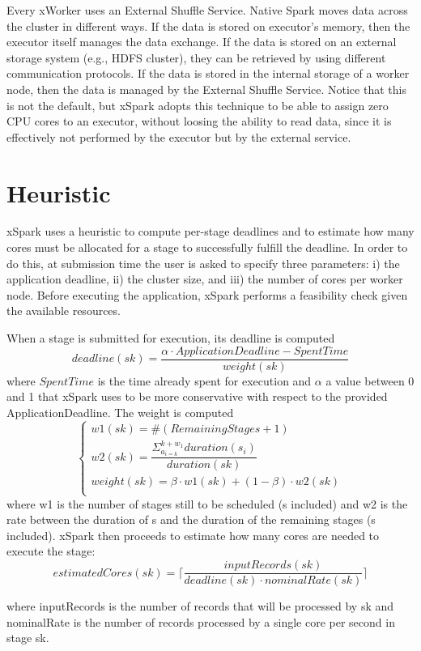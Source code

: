 Every xWorker uses an External Shuffle Service. Native Spark moves
data across the cluster in different ways. If the data is stored on executor’s
memory, then the executor itself manages the data exchange.
If the data is stored on an external storage system (e.g., HDFS cluster),
they can be retrieved by using different communication protocols. If
the data is stored in the internal storage of a worker node, then the
data is managed by the External Shuffle Service. Notice that this is not
the default, but xSpark adopts this technique to be able to assign
zero CPU cores to an executor, without loosing the ability to read
data, since it is effectively not performed by the executor but by the
external service.
\section{Heuristic}\label{sec:heuristic}
xSpark uses a heuristic to compute per-stage deadlines and to estimate
how many cores must be allocated for a stage to successfully
fulfill the deadline. In order to do this, at submission time the user
is asked to specify three parameters: i) the application deadline, ii)
the cluster size, and iii) the number of cores per worker node. Before
executing the application, xSpark performs a feasibility check given
the available resources.

When a stage is submitted for execution, its deadline is computed
\[deadline(sk) = \dfrac{\alpha\cdot ApplicationDeadline - SpentTime}{weight(sk)}\]
where $SpentTime$ is the time already spent for execution and $\alpha$ a
value between 0 and 1 that xSpark uses to be more conservative with
respect to the provided ApplicationDeadline. The weight is computed
\[\begin{cases}
w1(sk) = \#(RemainingStages + 1)\\
w2(sk) = \dfrac{{\Sigma}_{{a}_{i=k}}^{k+{w}_{1}}duration(s_i)}{duration(sk)}\\
weight(sk) = \beta\cdot w1(sk) + (1 - \beta) \cdot w2(sk)\\
\end{cases}\]
where w1 is the number of stages still to be scheduled (s included)
and w2 is the rate between the duration of s and the duration of the
remaining stages (s included).
xSpark then proceeds to estimate how many cores are needed to execute the stage:
\[estimatedCores(sk) = \lceil {\dfrac {inputRecords(sk)}{deadline(sk) \cdot nominalRate(sk)}}\rceil\]

where inputRecords is the number of records that will be processed
by sk and nominalRate is the number of records processed by a
single core per second in stage sk.

